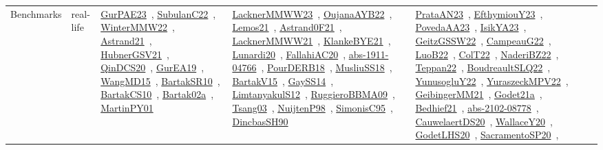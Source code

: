 {\begin{longtable}{lp{3cm}>{\raggedright\arraybackslash}p{6cm}>{\raggedright\arraybackslash}p{6cm}>{\raggedright\arraybackslash}p{8cm}}
Benchmarks & real-life & \href{works/GurPAE23.pdf}{GurPAE23}~\cite{GurPAE23}, \href{works/SubulanC22.pdf}{SubulanC22}~\cite{SubulanC22}, \href{works/WinterMMW22.pdf}{WinterMMW22}~\cite{WinterMMW22}, \href{works/Astrand21.pdf}{Astrand21}~\cite{Astrand21}, \href{works/HubnerGSV21.pdf}{HubnerGSV21}~\cite{HubnerGSV21}, \href{works/QinDCS20.pdf}{QinDCS20}~\cite{QinDCS20}, \href{works/GurEA19.pdf}{GurEA19}~\cite{GurEA19}, \href{works/WangMD15.pdf}{WangMD15}~\cite{WangMD15}, \href{works/BartakSR10.pdf}{BartakSR10}~\cite{BartakSR10}, \href{works/BartakCS10.pdf}{BartakCS10}~\cite{BartakCS10}, \href{works/Bartak02a.pdf}{Bartak02a}~\cite{Bartak02a}, \href{works/MartinPY01.pdf}{MartinPY01}~\cite{MartinPY01} & \href{works/LacknerMMWW23.pdf}{LacknerMMWW23}~\cite{LacknerMMWW23}, \href{works/OujanaAYB22.pdf}{OujanaAYB22}~\cite{OujanaAYB22}, \href{works/Lemos21.pdf}{Lemos21}~\cite{Lemos21}, \href{works/Astrand0F21.pdf}{Astrand0F21}~\cite{Astrand0F21}, \href{works/LacknerMMWW21.pdf}{LacknerMMWW21}~\cite{LacknerMMWW21}, \href{works/KlankeBYE21.pdf}{KlankeBYE21}~\cite{KlankeBYE21}, \href{works/Lunardi20.pdf}{Lunardi20}~\cite{Lunardi20}, \href{works/FallahiAC20.pdf}{FallahiAC20}~\cite{FallahiAC20}, \href{works/abs-1911-04766.pdf}{abs-1911-04766}~\cite{abs-1911-04766}, \href{works/PourDERB18.pdf}{PourDERB18}~\cite{PourDERB18}, \href{works/MusliuSS18.pdf}{MusliuSS18}~\cite{MusliuSS18}, \href{works/BartakV15.pdf}{BartakV15}~\cite{BartakV15}, \href{works/GaySS14.pdf}{GaySS14}~\cite{GaySS14}, \href{works/LimtanyakulS12.pdf}{LimtanyakulS12}~\cite{LimtanyakulS12}, \href{works/RuggieroBBMA09.pdf}{RuggieroBBMA09}~\cite{RuggieroBBMA09}, \href{works/Tsang03.pdf}{Tsang03}~\cite{Tsang03}, \href{works/NuijtenP98.pdf}{NuijtenP98}~\cite{NuijtenP98}, \href{works/SimonisC95.pdf}{SimonisC95}~\cite{SimonisC95}, \href{works/DincbasSH90.pdf}{DincbasSH90}~\cite{DincbasSH90} & \href{works/PrataAN23.pdf}{PrataAN23}~\cite{PrataAN23}, \href{works/EfthymiouY23.pdf}{EfthymiouY23}~\cite{EfthymiouY23}, \href{works/PovedaAA23.pdf}{PovedaAA23}~\cite{PovedaAA23}, \href{works/IsikYA23.pdf}{IsikYA23}~\cite{IsikYA23}, \href{works/GeitzGSSW22.pdf}{GeitzGSSW22}~\cite{GeitzGSSW22}, \href{works/CampeauG22.pdf}{CampeauG22}~\cite{CampeauG22}, \href{works/LuoB22.pdf}{LuoB22}~\cite{LuoB22}, \href{works/ColT22.pdf}{ColT22}~\cite{ColT22}, \href{works/NaderiBZ22.pdf}{NaderiBZ22}~\cite{NaderiBZ22}, \href{works/Teppan22.pdf}{Teppan22}~\cite{Teppan22}, \href{works/BoudreaultSLQ22.pdf}{BoudreaultSLQ22}~\cite{BoudreaultSLQ22}, \href{works/YunusogluY22.pdf}{YunusogluY22}~\cite{YunusogluY22}, \href{works/YuraszeckMPV22.pdf}{YuraszeckMPV22}~\cite{YuraszeckMPV22}, \href{works/GeibingerMM21.pdf}{GeibingerMM21}~\cite{GeibingerMM21}, \href{works/Godet21a.pdf}{Godet21a}~\cite{Godet21a}, \href{works/Bedhief21.pdf}{Bedhief21}~\cite{Bedhief21}, \href{works/abs-2102-08778.pdf}{abs-2102-08778}~\cite{abs-2102-08778}, \href{works/CauwelaertDS20.pdf}{CauwelaertDS20}~\cite{CauwelaertDS20}, \href{works/WallaceY20.pdf}{WallaceY20}~\cite{WallaceY20}, \href{works/GodetLHS20.pdf}{GodetLHS20}~\cite{GodetLHS20}, \href{works/SacramentoSP20.pdf}{SacramentoSP20}~\cite{SacramentoSP20}, 
\end{longtable}}
